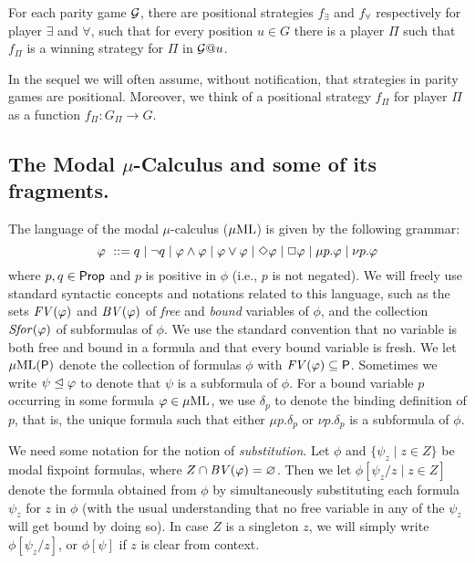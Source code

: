 \begin{fact}
\label{THM_posDet_ParityGames}
For each parity game $\mathcal{G}$, there are positional strategies $f_{\exists}$
and $f_{\forall}$ respectively for player $\exists$ and $\forall$, such that
for every position $u \in G$ there is a player $\Pi$ such that $f_{\Pi}$ is a
winning strategy for $\Pi$ in $\mathcal{G}@u$.
\end{fact}
%
In the sequel we will often assume, without notification, that strategies in
parity games are positional. 
Moreover, we think of a positional strategy $f_\Pi$ for player $\Pi$ as a 
function $f_\Pi:G_\Pi\to G$.

\subsection{The Modal $\mu$-Calculus and some of its fragments.}
\label{subsec:mu}

The language of the modal $\mu$-calculus ($\mu\mathrm{ML}$) is given by the following 
grammar:
%
\begin{equation*}
    \varphi\ \mathrel{::=}  q \mid \neg q \mid \varphi \land \varphi \mid
    \varphi \lor \varphi \mid  \Diamond \varphi \mid \Box \varphi \mid
    \mu p.\varphi \mid \nu p.\varphi
\end{equation*}
%
where $p,q \in \mathsf{Prop}$ and $p$ is positive in $\phi$ (i.e., $p$ is not
negated).
We will freely use standard syntactic concepts and notations related to this
language, such as the sets $\mathit{FV}(\varphi)$ and $\mathit{BV}(\varphi)$ of \emph{free} and 
\emph{bound} variables of $\phi$, and the collection $\mathit{Sfor}(\varphi)$ of subformulas
of $\phi$.
We use the standard convention that no variable is both free and bound in a
formula and that every bound variable is fresh.
We let $\mu\mathrm{ML}(\mathsf{P})$ denote the collection of formulas $\phi$ with $\mathit{FV}(\varphi)
\subseteq \mathsf{P}$.
Sometimes we write $\psi \trianglelefteq \varphi$ to denote that $\psi$ is a subformula
of $\phi$.
%
For a bound variable $p$ occurring in some formula $\varphi \in \mu\mathrm{ML}$, we use
$\delta_p$ to denote the binding definition of $p$, that is, the unique formula
such that either $\mu p.\delta_p$ or $\nu p.\delta_p$ is a subformula of 
$\phi$.

We need some notation for the notion of \emph{substitution}.
Let $\phi$ and $\{ \psi_{z} \mid z \in Z \}$ be modal fixpoint formulas, where
$Z \cap \mathit{BV}{(\varphi)} = \varnothing$.
Then we let $\phi[\psi_{z}/z \mid z \in Z]$
denote the formula obtained from $\phi$ by simultaneously substituting each
formula $\psi_{z}$ for $z$ in $\phi$ (with the usual understanding that no 
free variable in any of the $\psi_{z}$ will get bound by doing so).
In case $Z$ is a singleton $z$, we will simply write $\phi[\psi_{z}/z]$, or 
$\phi[\psi]$ if $z$ is clear from context.
\smallskip

